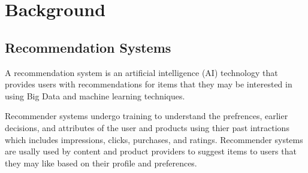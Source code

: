 \chapter{Background}
\minitoc









\section{Recommendation Systems}\label{sec:recommendation-systems}
A recommendation system is an artificial intelligence (AI) technology that provides users with recommendations for items that they may be interested in using Big Data and machine learning techniques. 

Recommender systems undergo training to understand the prefrences, earlier decisions, and attributes of the user and products using thier past intractions which includes impressions, clicks, purchases, and ratings. Recommender systems are usally used by content and product providers to suggest items to users that they may like based on their profile and preferences.
